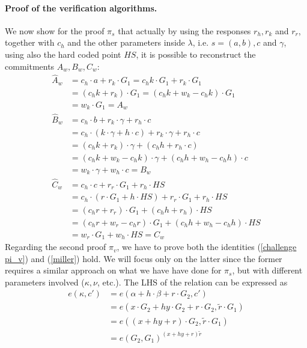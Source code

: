 \documentclass[twocolumn]{article}
\begin{document}
\paragraph{Proof of the verification algorithms.} We now show for the proof $\pi_s$ that actually by using the responses $r_h, r_k$ and $r_r$, together with $c_h$ and the other parameters inside $\lambda$, i.e. $s=(a,b), c$ and $\gamma$, using also the hard coded point $HS$, it is possible to reconstruct the commitments $A_w, B_w, C_w$:
\begin{align*}
    \widehat{A}_w   &= c_h\cdot a + r_k\cdot G_1 = c_h k \cdot G_1 + r_k \cdot G_1 \\
                    &= (c_h k + r_k)\cdot G_1 = (c_h k + w_k - c_h k)\cdot G_1 \\
                    &= w_k\cdot G_1 = A_w \\
    \widehat{B}_w   &= c_h\cdot b + r_k\cdot \gamma + r_h\cdot c \\
                    &= c_h\cdot (k\cdot \gamma + h\cdot c) + r_k\cdot\gamma + r_h\cdot c \\
                    &= (c_h k + r_k) \cdot\gamma + (c_h h + r_h\cdot c) \\
                    &= (c_h k + w_k - c_h k ) \cdot\gamma + (c_h h + w_h - c_h h)\cdot c \\
                    &= w_k\cdot\gamma + w_h\cdot c = B_w \\
    \widehat{C}_w   &= c_h\cdot c + r_r\cdot G_1 + r_h\cdot HS \\
                    &= c_h\cdot (r\cdot G_1 + h\cdot HS) + r_r\cdot G_1 + r_h\cdot HS \\
                    &= (c_h r + r_r)\cdot G_1 + (c_h h + r_h)\cdot HS \\
                    &= (c_h r + w_r - c_h r)\cdot G_1 + (c_h h + w_h - c_h h)\cdot HS \\
                    &= w_r \cdot G_1 + w_h\cdot HS = C_w
\end{align*} 
Regarding the second proof $\pi_v$, we have to prove both the identities (\ref{challenge pi_v}) and (\ref{miller}) hold. We will focus only on the latter since the former requires a similar approach on what we have have done for $\pi_s$, but with different parameters involved ($\kappa, \nu$, etc.). The LHS of the relation can be expressed as
\begin{align*}
    e(\kappa, c') &= e(\alpha + h\cdot\beta + r\cdot G_2, c') \\
    &= e(x\cdot G_2 + hy\cdot G_2  + r\cdot G_2,\tilde{r}\cdot G_1) \\
    &= e((x+hy+r)\cdot G_2, \tilde{r}\cdot G_1) \\
    &= e(G_2,G_1)^{(x+hy+r)\tilde{r}}
\end{align*}
\end{document}
